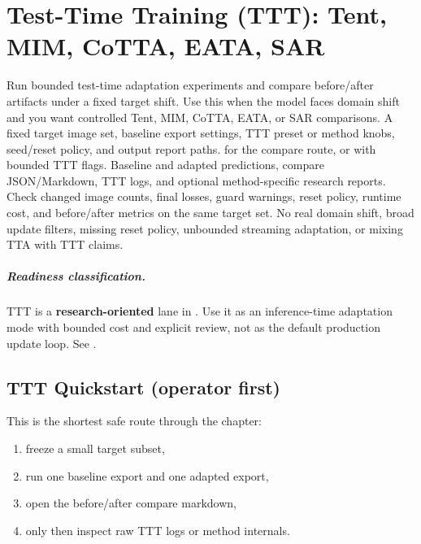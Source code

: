 \chapter{Test-Time Training (TTT): Tent, MIM, CoTTA, EATA, SAR}
\label{chap:ttt}


\WorkflowOpening
{Run bounded test-time adaptation experiments and compare before/after artifacts under a fixed target shift.}
{Use this when the model faces domain shift and you want controlled Tent, MIM, CoTTA, EATA, or SAR comparisons.}
{A fixed target image set, baseline export settings, TTT preset or method knobs, seed/reset policy, and output report paths.}
{ for the compare route, or  with bounded TTT flags.}
{Baseline and adapted predictions, compare JSON/Markdown, TTT logs, and optional method-specific research reports.}
{Check changed image counts, final losses, guard warnings, reset policy, runtime cost, and before/after metrics on the same target set.}
{No real domain shift, broad update filters, missing reset policy, unbounded streaming adaptation, or mixing TTA with TTT claims.}

\paragraph{Readiness classification.}
TTT is a \textbf{research-oriented} lane in \yolozu{}.
Use it as an inference-time adaptation mode with bounded cost and explicit review, not as the default production update loop.
See .

\section{TTT Quickstart (operator first)}
This is the shortest safe route through the chapter:
\begin{enumerate}
  \item freeze a small target subset,
  \item run one baseline export and one adapted export,
  \item open the before/after compare markdown,
  \item only then inspect raw TTT logs or method internals.
\end{enumerate}


